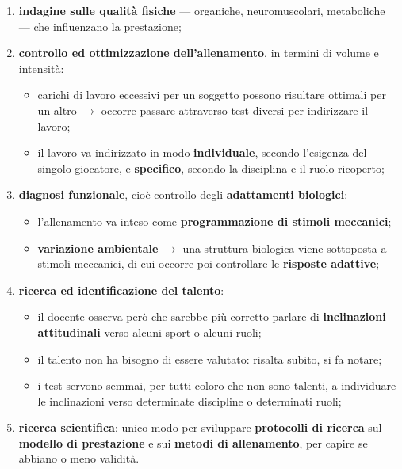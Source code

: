 \begin{enumerate}
  \item \textbf{indagine sulle qualità fisiche} --- organiche, neuromuscolari, metaboliche --- che
    influenzano la prestazione;
  \item \textbf{controllo ed ottimizzazione dell'allenamento}, in termini di volume e intensità:
    \begin{itemize}
      \item carichi di lavoro eccessivi per un soggetto possono risultare ottimali per un altro
        $\rightarrow$ occorre passare attraverso test diversi per indirizzare il lavoro;
      \item il lavoro va indirizzato in modo \textbf{individuale}, secondo l'esigenza del singolo
        giocatore, e \textbf{specifico}, secondo la disciplina e il ruolo ricoperto;
    \end{itemize}
  \item \textbf{diagnosi funzionale}, cioè controllo degli \textbf{adattamenti biologici}:
    \begin{itemize}
      \item l'allenamento va inteso come \textbf{programmazione di stimoli meccanici};
      \item \textbf{variazione ambientale} $\rightarrow$ una struttura biologica viene sottoposta a
        stimoli meccanici, di cui occorre poi controllare le \textbf{risposte adattive};
    \end{itemize}
  \item \textbf{ricerca ed identificazione del talento}:
    \begin{itemize}
      \item il docente osserva però che sarebbe più corretto parlare di \textbf{inclinazioni
        attitudinali} verso alcuni sport o alcuni ruoli;
      \item il talento non ha bisogno di essere valutato: risalta subito, si fa notare;
      \item i test servono semmai, per tutti coloro che non sono talenti, a individuare le
        inclinazioni verso determinate discipline o determinati ruoli;
    \end{itemize}
  \item \textbf{ricerca scientifica}: unico modo per sviluppare \textbf{protocolli di ricerca} sul
    \textbf{modello di prestazione} e sui \textbf{metodi di allenamento}, per capire se abbiano o
    meno validità.
\end{enumerate}

